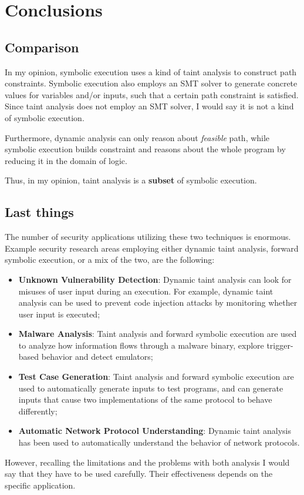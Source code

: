 \section{Conclusions}
\subsection{Comparison}
In my opinion, symbolic execution uses a kind of taint analysis to construct path constraints. Symbolic execution also employs an SMT solver to generate concrete values for variables and/or inputs, such that a certain path constraint is satisfied. Since taint analysis does not employ an SMT solver, I would say it is not a kind of symbolic execution.

Furthermore, dynamic analysis can only reason about \textit{feasible} path, while symbolic execution builds constraint and reasons about the whole program by reducing it in the domain of logic.

Thus, in my opinion, taint analysis is a \textbf{subset} of symbolic execution.

\subsection{Last things}
The number of security applications utilizing these two techniques is enormous. Example security research areas employing either dynamic taint analysis, forward symbolic execution, or a mix of the two, are the following:
\begin{itemize}
	\item \textbf{Unknown Vulnerability Detection}: Dynamic taint analysis can look for misuses of user input during an execution. For example, dynamic taint analysis can be used to prevent code injection attacks by monitoring whether user input is executed;
	\item \textbf{Malware Analysis}: Taint analysis and forward symbolic execution are used to analyze how information flows through a malware binary, explore trigger-based behavior and detect emulators;
	\item \textbf{Test Case Generation}: Taint analysis and forward symbolic execution are used to automatically generate inputs to test programs, and can generate inputs that cause two implementations of the same protocol to behave differently;
	\item \textbf{Automatic Network Protocol Understanding}: Dynamic taint analysis has been used to automatically understand the behavior of network protocols.
\end{itemize}

However, recalling the limitations and the problems with both analysis I would say that they have to be used carefully. Their effectiveness depends on the specific application.

